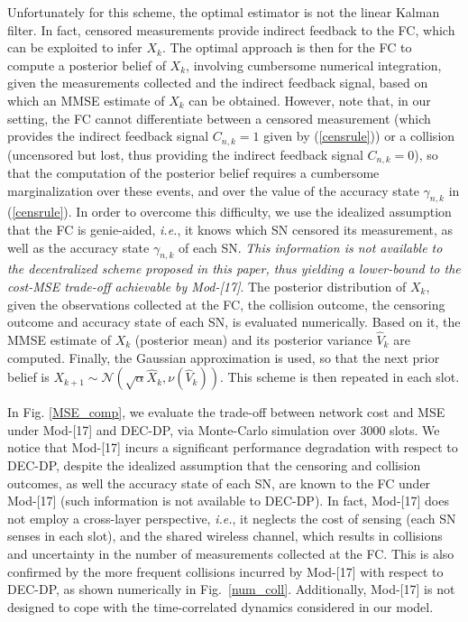 \documentclass[10pt,twocolumn,twoside]{IEEEtran}
\theoremstyle{plain}
\begin{document}
Unfortunately for this scheme, the optimal estimator is not the linear Kalman filter. In fact,
censored measurements provide indirect feedback to the FC, which can be exploited to infer $X_k$.
The optimal approach is then for the FC to compute a posterior belief of $X_k$,
involving cumbersome numerical integration,
 given the measurements collected and the indirect feedback signal,
based on which an MMSE estimate of $X_k$ can be obtained.
However, note that, in our setting, the FC cannot differentiate between a censored measurement (which provides the indirect feedback signal 
$C_{n,k}{=}1$ given by (\ref{censrule})) or a collision (uncensored but lost, thus providing the indirect feedback signal $C_{n,k}{=}0$),
so that the computation of the posterior belief requires a cumbersome marginalization over these events, and over the value of 
the accuracy state $\gamma_{n,k}$ in (\ref{censrule}).
In order to overcome this difficulty, we use the idealized assumption that the FC is genie-aided, \emph{i.e.}, it knows which SN censored its measurement, as well as the accuracy state $\gamma_{n,k}$ of each SN. \emph{This information is not available to the decentralized scheme proposed in this paper, thus yielding a lower-bound to the cost-MSE trade-off achievable by Mod-[17]}. The  posterior distribution  of $X_k$, given the observations collected at the FC, the collision outcome,
 the censoring outcome and accuracy state of each SN, is evaluated numerically. Based on it, 
 the MMSE estimate of $X_k$ (posterior mean) and its posterior variance $\hat V_k$ are computed.
 Finally,
the Gaussian approximation is used, so that
the next prior belief is
 $X_{k+1}{\sim}\mathcal N(\sqrt{\alpha}\hat X_{k},\nu(\hat V_{k}))$. This scheme is then repeated in each slot.
 
In Fig. \ref{MSE_comp}, we evaluate the trade-off between network cost and MSE
under Mod-[17] and DEC-DP, via Monte-Carlo simulation over 3000 slots.
We notice that Mod-[17] incurs a significant performance degradation with respect to DEC-DP, despite the idealized assumption that 
the censoring and collision outcomes, as well the accuracy state of each SN, are known to the FC under Mod-[17] (such information is not available to DEC-DP).
In fact, Mod-[17] does not employ a cross-layer perspective, \emph{i.e.}, it neglects the cost of sensing (each SN senses in each slot), and the shared wireless channel,
which results in collisions and uncertainty in the number of measurements collected at the FC.
This is also confirmed by the more frequent collisions incurred by Mod-[17] with respect to DEC-DP, as shown numerically in Fig.~\ref{num_coll}.
Additionally, Mod-[17] is not designed  to cope with the time-correlated dynamics considered in our model.
\end{document}
